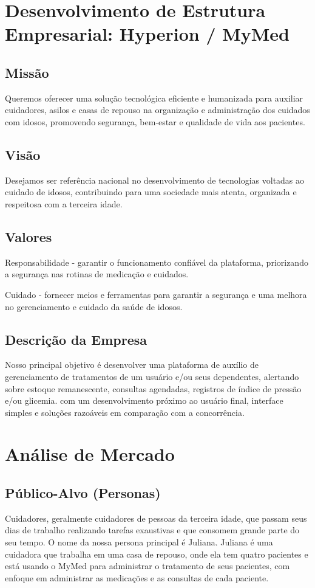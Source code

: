 \setcounter{section}{0}
\section{Desenvolvimento de Estrutura Empresarial: Hyperion / MyMed}

\subsection*{Missão}
Queremos oferecer uma solução tecnológica eficiente e humanizada para auxiliar cuidadores, asilos e casas de repouso na organização e administração dos cuidados com idosos, promovendo segurança, bem-estar e qualidade de vida aos pacientes.

\subsection*{Visão}
Desejamos ser referência nacional no desenvolvimento de tecnologias voltadas ao cuidado de idosos, contribuindo para uma sociedade mais atenta, organizada e respeitosa com a terceira idade.  

\subsection*{Valores}
Responsabilidade - garantir o funcionamento confiável da plataforma, priorizando a segurança nas rotinas de medicação e cuidados.  

Cuidado - fornecer meios e ferramentas para garantir a segurança e uma melhora no gerenciamento e cuidado da saúde de idosos. 

\subsection*{Descrição da Empresa}
Nosso principal objetivo é desenvolver uma plataforma de auxílio de gerenciamento de tratamentos de um usuário e/ou seus dependentes, alertando sobre estoque remanescente, consultas agendadas, registros de índice de pressão e/ou glicemia. com um desenvolvimento próximo ao usuário final, interface simples e soluções razoáveis em comparação com a concorrência. 

\section{Análise de Mercado}

\subsection*{Público-Alvo (Personas)}
Cuidadores, geralmente cuidadores de pessoas da terceira idade, que passam seus dias de trabalho realizando tarefas exaustivas e que consomem grande parte do seu tempo.  O nome da nossa persona principal é Juliana. Juliana é uma cuidadora que trabalha em uma casa de repouso, onde ela tem quatro pacientes e está usando o MyMed para administrar o tratamento de seus pacientes, com enfoque em administrar as medicações e as consultas de cada paciente. 

